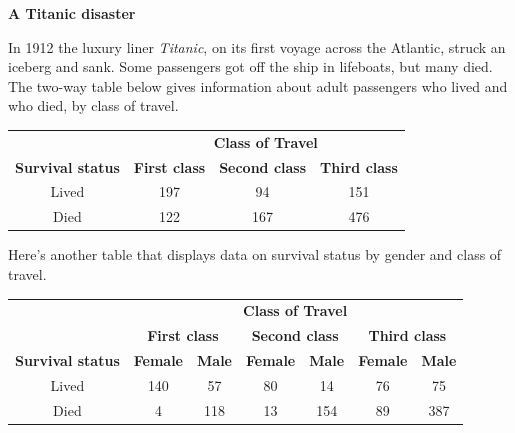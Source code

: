 \documentclass[a4paper, 12pt,twoside]{book}
\begin{document}
\colorbox{champagne}{
\begin{minipage}{\textwidth}
\large\textbf{A Titanic disaster}

In 1912 the luxury liner \textit{Titanic}, on its first voyage across the Atlantic, struck an iceberg and sank. Some passengers got off the ship in lifeboats, but many died. The two-way table below gives information about adult passengers who lived and who died, by class of travel.

\begin{table}[H]
\centering
\begin{tabular}{cccc}
\hline
&\multicolumn{3}{c}{\textbf{Class of Travel}}\\
\hhline{~---}
\textbf{Survival status}&\textbf{First class}&\textbf{Second class}&\textbf{Third class}\\
\vspace{0.3cm}
Lived&197&94&151\\
Died&122&167&476\\
\hline
\end{tabular}
\end{table}

Here's another table that displays data on survival status by gender and class of travel.
\begin{table}[H]
\centering
\begin{tabular}{ccccccc}
\hline
&\multicolumn{6}{c}{\textbf{Class of Travel}}\\
\hhline{~------}
&\multicolumn{2}{c}{\textbf{First class}}&\multicolumn{2}{c}{\textbf{Second class}}&\multicolumn{2}{c}{\textbf{Third class}}\\
\hhline{~------}
\textbf{Survival status}&\textbf{Female}&\textbf{Male}&\textbf{Female}&\textbf{Male}&\textbf{Female}&\textbf{Male}\\

\vspace{0.3cm}

Lived&140&57&80&14&76&75\\

\vspace{0.3cm}

Died&4&118&13&154&89&387\\
\hline

\end{tabular}
\end{table}


\end{minipage}}
\end{document}
